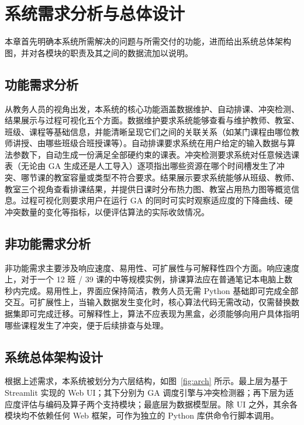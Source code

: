 \hspace*{\fill}
\section{系统需求分析与总体设计}

本章首先明确本系统所需解决的问题与所需交付的功能，进而给出系统总体架构图，并对各模块的职责及其之间的数据流加以说明。

\subsection{功能需求分析}

从教务人员的视角出发，本系统的核心功能涵盖数据维护、自动排课、冲突检测、结果展示与过程可视化五个方面。数据维护要求系统能够查看与维护教师、教室、班级、课程等基础信息，并能清晰呈现它们之间的关联关系（如某门课程由哪位教师讲授、由哪些班级合班授课等）。自动排课要求系统在用户给定的输入数据与算法参数下，自动生成一份满足全部硬约束的课表。冲突检测要求系统对任意候选课表（无论由 GA 生成还是人工导入）逐项指出哪些资源在哪个时间槽发生了冲突、哪节课的教室容量或类型不符合要求。结果展示要求系统能够从班级、教师、教室三个视角查看排课结果，并提供日课时分布热力图、教室占用热力图等概览信息。过程可视化则要求用户在运行 GA 的同时可实时观察适应度的下降曲线、硬冲突数量的变化等指标，以便评估算法的实际收敛情况。

\subsection{非功能需求分析}

非功能需求主要涉及响应速度、易用性、可扩展性与可解释性四个方面。响应速度上，对于一个 12 班 / 39 课的中等规模实例，排课算法应在普通笔记本电脑上数秒内完成。易用性上，界面应保持简洁，教务人员无需 Python 基础即可完成全部交互。可扩展性上，当输入数据发生变化时，核心算法代码无需改动，仅需替换数据集即可完成迁移。可解释性上，算法不应表现为黑盒，必须能够向用户具体指明哪些课程发生了冲突，便于后续排查与处理。

\subsection{系统总体架构设计}

根据上述需求，本系统被划分为六层结构，如图~\ref{fig:arch} 所示。最上层为基于 Streamlit 实现的 Web UI；其下分别为 GA 调度引擎与冲突检测器；再下层为适应度评估与编码及算子两个支持模块；最底层为数据模型层。除 UI 之外，其余各模块均不依赖任何 Web 框架，可作为独立的 Python 库供命令行脚本调用。

